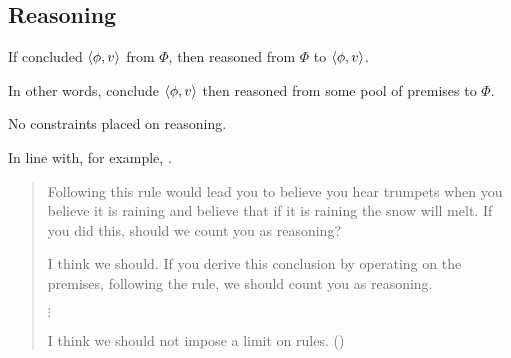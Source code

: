 \subsection{Reasoning}
\label{sec:overview:reasoning}

\begin{note}
  \begin{idea}
    \label{assu:C-culmination-of-R}
    If concluded \(\langle \phi, v \rangle\) from \(\Phi\), then reasoned from \(\Phi\) to \(\langle \phi, v \rangle\).
  \end{idea}

  In other words, conclude \(\langle \phi, v \rangle\) then reasoned from some pool of premises to \(\Phi\).
\end{note}

\begin{note}[No constraints]
  No constraints placed on reasoning.

  In line with, for example, \citeauthor{Broome:2013aa}.

  \begin{quote}
    Following this rule would lead you to believe you hear trumpets when you believe it is raining and believe that if it is raining the snow will melt. If you did this, should we count you as reasoning?

    I think we should. If you derive this conclusion by operating on the premises, following the rule, we should count you as reasoning.

    \mbox{}\hfill\(\vdots\)\hfill\mbox{}

    I think we should not impose a limit on rules.%
    \mbox{}\hfill\mbox{(\citeyear[233]{Broome:2013aa})}
  \end{quote}
\end{note}

